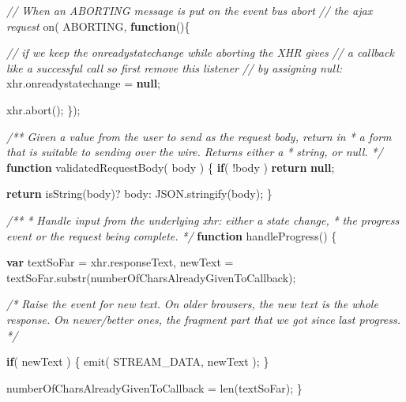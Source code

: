 \documentclass[12pt, ]{article}
\newenvironment{Shaded}{}{}
\newcommand{\KeywordTok}[1]{\textcolor[rgb]{0.00,0.44,0.13}{\textbf{{#1}}}}
\newcommand{\CommentTok}[1]{\textcolor[rgb]{0.38,0.63,0.69}{\textit{{#1}}}}
\newcommand{\OtherTok}[1]{\textcolor[rgb]{0.00,0.44,0.13}{{#1}}}
\newcommand{\FunctionTok}[1]{\textcolor[rgb]{0.02,0.16,0.49}{{#1}}}
\newcommand{\NormalTok}[1]{{#1}}
\begin{document}
\begin{Shaded}
\begin{Highlighting}[]
   \CommentTok{// When an ABORTING message is put on the event bus abort }
   \CommentTok{// the ajax request         }
   \FunctionTok{on}\NormalTok{( ABORTING, }\KeywordTok{function}\NormalTok{()\{}
  
      \CommentTok{// if we keep the onreadystatechange while aborting the XHR gives }
      \CommentTok{// a callback like a successful call so first remove this listener}
      \CommentTok{// by assigning null:}
      \OtherTok{xhr}\NormalTok{.}\FunctionTok{onreadystatechange} \NormalTok{= }\KeywordTok{null}\NormalTok{;}
            
      \OtherTok{xhr}\NormalTok{.}\FunctionTok{abort}\NormalTok{();}
   \NormalTok{\});}

   \CommentTok{/** Given a value from the user to send as the request body, return in}
\CommentTok{    *  a form that is suitable to sending over the wire. Returns either a }
\CommentTok{    *  string, or null.        }
\CommentTok{    */}
   \KeywordTok{function} \FunctionTok{validatedRequestBody}\NormalTok{( body ) \{}
      \KeywordTok{if}\NormalTok{( !body )}
         \KeywordTok{return} \KeywordTok{null}\NormalTok{;}
   
      \KeywordTok{return} \FunctionTok{isString}\NormalTok{(body)? body: }\OtherTok{JSON}\NormalTok{.}\FunctionTok{stringify}\NormalTok{(body);}
   \NormalTok{\}      }

   \CommentTok{/** }
\CommentTok{    * Handle input from the underlying xhr: either a state change,}
\CommentTok{    * the progress event or the request being complete.}
\CommentTok{    */}
   \KeywordTok{function} \FunctionTok{handleProgress}\NormalTok{() \{}
                        
      \KeywordTok{var} \NormalTok{textSoFar = }\OtherTok{xhr}\NormalTok{.}\FunctionTok{responseText}\NormalTok{,}
          \NormalTok{newText = }\OtherTok{textSoFar}\NormalTok{.}\FunctionTok{substr}\NormalTok{(numberOfCharsAlreadyGivenToCallback);}
      
      
      \CommentTok{/* Raise the event for new text.}
\CommentTok{      }
\CommentTok{         On older browsers, the new text is the whole response. }
\CommentTok{         On newer/better ones, the fragment part that we got since }
\CommentTok{         last progress. */}
         
      \KeywordTok{if}\NormalTok{( newText ) \{}
         \FunctionTok{emit}\NormalTok{( STREAM_DATA, newText );}
      \NormalTok{\} }

      \NormalTok{numberOfCharsAlreadyGivenToCallback = }\FunctionTok{len}\NormalTok{(textSoFar);}
   \NormalTok{\}}
   

\end{Highlighting}
\end{Shaded}
\end{document}
